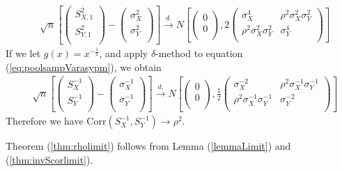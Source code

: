 \documentclass[review]{elsarticle}
\newcommand{\cor}{\text{Corr}}
\begin{document}
\begin{equation}\label{eq:poolsampVarasypm}\tag{B.8}
\begin{aligned}
& \sqrt{n}\left[\left( \begin{array}{c}
S_{X, 1}^2\\
S_{Y, 1}^2\\
\end{array}\right)
-
\left( \begin{array}{c}
\sigma_X^2\\
\sigma_Y^2\\
\end{array}\right)
\right]
\stackrel{d.}{\longrightarrow} 
N\left[
\left(\begin{array}{c}
0\\
0\\
\end{array} \right), 
2\left(
\begin{array}{cc}
\sigma_X^4 &\rho^2\sigma_X^2\sigma_Y^2 \\
\rho^2\sigma_X^2\sigma_Y^2  &\sigma_Y^4 \\
\end{array}
\right)
\right] 
\end{aligned}
\end{equation}
If we let $g(x) = x^{-\frac{1}{2}}$, and apply $\delta$-method to equation 
(\ref{eq:poolsampVarasypm}), we obtain
\begin{equation}\label{eq:invSasymp}\tag{B.9}
\begin{aligned}
& \sqrt{n}\left[\left( \begin{array}{c}
S_X^{-1}\\
S_Y^{-1}\\
\end{array}\right)
-
\left( \begin{array}{c}
\sigma_X^{-1}\\
\sigma_Y^{-1}\\
\end{array}\right)
\right]
\stackrel{d.}{\longrightarrow} 
N\left[
\left(\begin{array}{c}
0\\
0\\
\end{array} \right), 
\frac{1}{2}\left(
\begin{array}{cc}
\sigma_X^{-2} &\rho^2\sigma_X^{-1}\sigma_Y^{-1} \\
\rho^2\sigma_X^{-1}\sigma_Y^{-1}  &\sigma_Y^{-2} \\
\end{array}
\right)
\right] 
\end{aligned}
\end{equation}
Therefore we have $\cor(S_X^{-1}, S_Y^{-1}) \rightarrow 
\rho^2$.

Theorem (\ref{thm:rholimit}) follows from Lemma (\ref{lemmaLimit}) and (\ref{thm:invScorlimit}).
\end{document}
